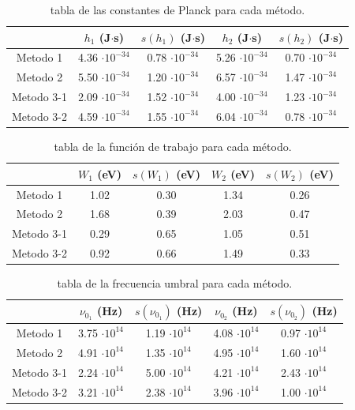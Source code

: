 \documentclass[12pt,a4paper]{article}
\numberwithin{equation}{section}
\numberwithin{table}{section}
\numberwithin{figure}{section}
\begin{document}
\begin{table}[h!] \centering 
\renewcommand{\arraystretch}{1.3} %
\begin{tabular}{c|c|c|c|c}  
 & $h_1$ (J$\cdot$s) & $s(h_1)$ (J$\cdot$s) & $h_2$ (J$\cdot$s) & $s(h_2)$ (J$\cdot$s) \\ \hline 
Metodo 1 & 4.36 $\cdot 10^{-34}$ & 0.78 $\cdot 10^{-34}$ & 5.26 $\cdot 10^{-34}$ & 0.70 $\cdot 10^{-34}$ \\ 
Metodo 2 & 5.50 $\cdot 10^{-34}$ & 1.20 $\cdot 10^{-34}$ & 6.57 $\cdot 10^{-34}$ & 1.47 $\cdot 10^{-34}$ \\ 
Metodo 3-1 & 2.09 $\cdot 10^{-34}$ & 1.52 $\cdot 10^{-34}$ & 4.00 $\cdot 10^{-34}$ & 1.23 $\cdot 10^{-34}$ \\ 
Metodo 3-2 & 4.59 $\cdot 10^{-34}$ & 1.55 $\cdot 10^{-34}$ & 6.04 $\cdot 10^{-34}$ & 0.78 $\cdot 10^{-34}$ \\ \hline
\end{tabular}\caption{tabla de las constantes de Planck para cada método.} 
\label{Tab:7.3.1} 
\end{table} 

 
\begin{table}[h!] \centering 
\renewcommand{\arraystretch}{1.1} %
\begin{tabular}{c|c|c|c|c} 
 & $W_1$ (eV) & $s(W_1)$ (eV) & $W_2$ (eV) & $s(W_2)$ (eV) \\ \hline 
Metodo 1  & 1.02  & 0.30 & 1.34  & 0.26  \\ 
Metodo 2  & 1.68  & 0.39 & 2.03  & 0.47  \\ 
Metodo 3-1  & 0.29  & 0.65 & 1.05  & 0.51  \\ 
Metodo 3-2  & 0.92  & 0.66 & 1.49  & 0.33  \\  \hline
\end{tabular}
\caption{tabla de la función de trabajo para cada método.} 
\label{Tab:7.3.2} 
\end{table} 

\begin{table}[h!] \centering 
\renewcommand{\arraystretch}{1.3} %
\begin{tabular}{c|c|c|c|c} 
 & $\nu_{0_1}$ (Hz) & $s(\nu_{0_1})$ (Hz) & $\nu_{0_2}$ (Hz) & $s(\nu_{0_2})$ (Hz) \\ \hline 
Metodo 1 & 3.75 $\cdot 10^{14}$ & 1.19 $\cdot 10^{14}$ & 4.08 $\cdot 10^{14}$ & 0.97 $\cdot 10^{14}$ \\ 
Metodo 2 & 4.91 $\cdot 10^{14}$ & 1.35 $\cdot 10^{14}$ & 4.95 $\cdot 10^{14}$ & 1.60 $\cdot 10^{14}$ \\ 
Metodo 3-1 & 2.24 $\cdot 10^{14}$ & 5.00 $\cdot 10^{14}$ & 4.21 $\cdot 10^{14}$ & 2.43 $\cdot 10^{14}$ \\ 
Metodo 3-2 & 3.21 $\cdot 10^{14}$ & 2.38 $\cdot 10^{14}$ & 3.96 $\cdot 10^{14}$ & 1.00 $\cdot 10^{14}$ \\  \hline
\end{tabular}
\caption{tabla de la frecuencia umbral para cada método.} 
\label{Tab:7.3.3} 
\end{table} 
\end{document}
